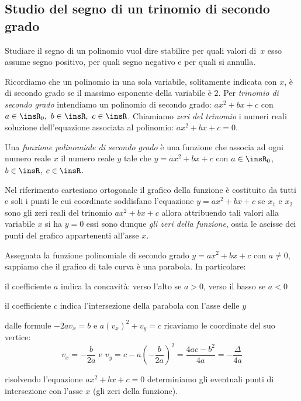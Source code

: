 \subsection{Studio del segno di un trinomio di secondo grado}
\label{sec:diseq_trinomio}

Studiare il segno di un polinomio vuol dire stabilire per quali valori 
di~$x$ esso assume segno positivo, per quali segno negativo e per quali 
si annulla.

Ricordiamo che un polinomio in una sola variabile, solitamente indicata con $x$, 
è di secondo grado se il massimo esponente della variabile è $2$. 
Per \emph{trinomio di secondo grado} intendiamo un polinomio di secondo grado: 
$ax^2+bx+c$ con $a\in \insR_{0},~b\in \insR,~c\in \insR$. 
Chiamiamo \emph{zeri del trinomio} i numeri reali soluzione dell'equazione 
associata al polinomio: $ax^2+bx+c=0$.

\begin{definizione}
Una \emph{funzione polinomiale di secondo grado} è una funzione che associa ad 
ogni numero reale $x$ il numero reale $y$ tale che
$y=ax^2+bx+c$ con $a\in \insR_{0}$, $b\in \insR$, $c\in \insR$.
\end{definizione}

Nel riferimento cartesiano ortogonale il grafico della funzione è costituito da 
tutti e soli i punti le cui coordinate soddisfano l'equazione $y=ax^2+bx+c$ se 
$x_1$ e $x_2$ sono gli zeri reali del trinomio $ax^2+bx+c$ allora attribuendo 
tali valori alla variabile $x$ si ha $y=0$ essi sono dunque \emph{gli zeri della 
funzione}, ossia le ascisse dei punti del grafico appartenenti all'asse $x$.

Assegnata la funzione polinomiale di secondo grado $y={ax}^2+{bx}+c$ con 
$a\neq 0$, sappiamo che il grafico di tale curva è una parabola. 
In particolare:
\begin{itemize*}
\item il coefficiente $a$ indica la concavità: verso l'alto se $a>0$, verso il 
basso se $a<0$
\item il coefficiente $c$ indica l'intersezione della parabola con l'asse delle 
$y$
\item dalle formule $-2av_x=b$ e $a(v_x)^2+v_y=c$ ricaviamo le coordinate del 
suo vertice:
\[v_x=-\frac b{2a} \text{ e } 
  v_y=c-a\left(-\frac{b}{2a}\right)^2=\frac{4ac-b^2}{4a}=-\frac{\Delta }{4a}\]
\item risolvendo l'equazione ${ax}^2+{bx}+c=0$ determiniamo gli eventuali punti 
di intersezione con l'asse $x$ (gli zeri della funzione).
\end{itemize*}

